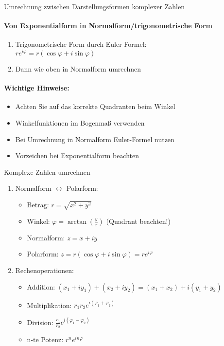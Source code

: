 \begin{KR}{Umrechnung zwischen Darstellungsformen komplexer Zahlen}
\paragraph{Von Exponentialform in Normalform/trigonometrische Form}
\begin{enumerate}
   \item Trigonometrische Form durch Euler-Formel:\\
   $re^{i\varphi} = r(\cos\varphi + i\sin\varphi)$
   \item Dann wie oben in Normalform umrechnen
\end{enumerate}

\paragraph{Wichtige Hinweise:}
\begin{itemize}
   \item Achten Sie auf das korrekte Quadranten beim Winkel
   \item Winkelfunktionen im Bogenmaß verwenden
   \item Bei Umrechnung in Normalform Euler-Formel nutzen
   \item Vorzeichen bei Exponentialform beachten
\end{itemize}
\end{KR}

\begin{KR}{Komplexe Zahlen umrechnen}
\begin{enumerate}
    \item Normalform $\leftrightarrow$ Polarform:
    \begin{itemize}
        \item Betrag: $r = \sqrt{x^2 + y^2}$
        \item Winkel: $\varphi = \arctan(\frac{y}{x})$ (Quadrant beachten!)
        \item Normalform: $z = x + iy$
        \item Polarform: $z = r(\cos\varphi + i\sin\varphi) = re^{i\varphi}$
    \end{itemize}
    
    \item Rechenoperationen:
    \begin{itemize}
        \item Addition: $(x_1 + iy_1) + (x_2 + iy_2) = (x_1+x_2) + i(y_1+y_2)$
        \item Multiplikation: $r_1r_2e^{i(\varphi_1 + \varphi_2)}$
        \item Division: $\frac{r_1}{r_2}e^{i(\varphi_1 - \varphi_2)}$
        \item n-te Potenz: $r^ne^{in\varphi}$
    \end{itemize}
\end{enumerate}
\end{KR}

